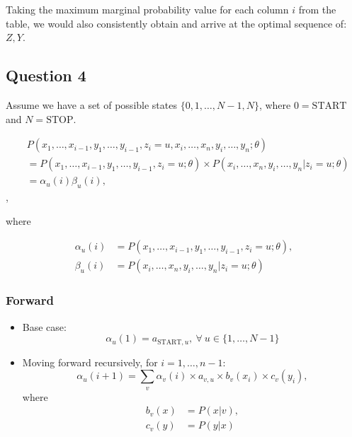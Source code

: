 \documentclass[11pt,fancychapters]{article}
\begin{document}
Taking the maximum marginal probability value for each column $i$ from the table, we would also consistently obtain and arrive at the optimal sequence of: $Z, Y$.

\subsection*{Question 4}

Assume we have a set of possible states $\{ 0, 1, \ldots, N - 1, N \}$, where $0 = \text{START}$ and $N = \text{STOP}$.

\begin{align*}
	&P(x_1, \ldots, x_{i-1}, y_1, \ldots, y_{i-1}, z_i = u, x_i, \ldots, x_n, y_i, \ldots, y_n; \theta) \\
	&= P(x_1, \ldots, x_{i-1}, y_1, \ldots, y_{i-1}, z_i = u; \theta) \times P(x_i, \ldots, x_n, y_i, \ldots, y_n | z_i = u; \theta) \\
	&= \alpha_u(i) \beta_u(i),
\end{align*},

where

\begin{align*}
	\alpha_u(i) &= P(x_1, \ldots, x_{i-1}, y_1, \ldots, y_{i-1}, z_i = u; \theta), \\
	\beta_u(i) &= P(x_i, \ldots, x_n, y_i, \ldots, y_n | z_i = u; \theta)
\end{align*}

\subsubsection*{Forward}

\begin{itemize}
	\item Base case:
	\begin{equation*}
		\alpha_u(1) = a_{\text{START}, u}, ~ \forall ~ u \in \{ 1, \ldots, N - 1 \}
	\end{equation*}

	\item Moving forward recursively, for $i = 1, \ldots, n - 1$:
	\begin{equation*}
		\alpha_u(i + 1) = \sum_v \alpha_v(i) \times a_{v, u} \times b_v(x_i) \times c_v(y_i),
	\end{equation*}
	where
	\begin{align*}
		b_v(x) &= P(x | v), \\
		c_v(y) &= P(y | x)
	\end{align*}
\end{itemize}
\end{document}

